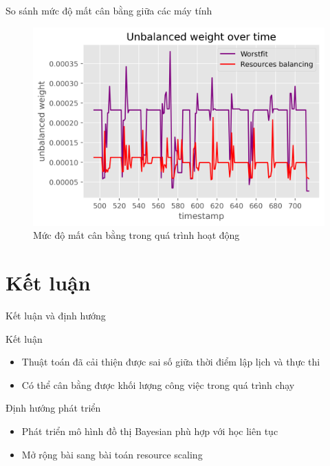 \documentclass[11pt,xcolor={dvipsnames}, aspectratio=169]{beamer}
\begin{document}
\begin{frame}
{So sánh mức độ mất cân bằng giữa các máy tính}
\begin{figure}[h!]
	\centering
	\includegraphics[scale=0.6]{images/unbalanced_weights.png}
	\caption{Mức độ mất cân bằng trong quá trình hoạt động}
\end{figure}
\end{frame}

\section{Kết luận}

\begin{frame}
{Kết luận và định hướng}
\pause
\begin{block}
{Kết luận}
	\begin{itemize}
		\item <2-> Thuật toán đã cải thiện được sai số giữa thời điểm lập lịch và thực thi
		\item <3->Có thể cân bằng được khối lượng công việc trong quá trình chạy 
	\end{itemize}
\end{block}

\pause
\pause

\begin{block}
{Định hướng phát triển}
\begin{itemize}
	\item <5-> Phát triển mô hình đồ thị Bayesian phù hợp với học liên tục 
	\item <6-> Mở rộng bài sang bài toán resource scaling
\end{itemize}
\end{block}
\end{frame}

{\1
\begin{frame}
\end{frame}}
\end{document}
